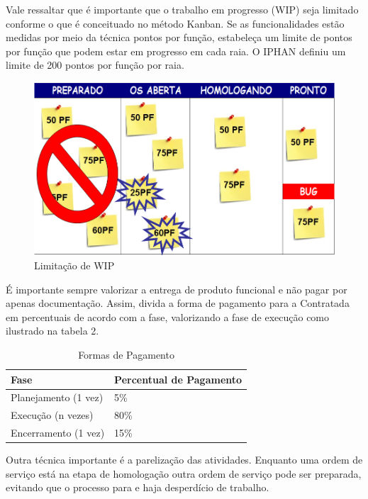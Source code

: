 Vale ressaltar que é importante que o trabalho em progresso (WIP) seja limitado conforme o que é conceituado no método Kanban. Se as funcionalidades estão medidas por meio da técnica pontos por função, estabeleça um limite de pontos por função que podem estar em progresso em cada raia. O IPHAN definiu um limite de 200 pontos por função por raia. 

\begin{figure}[h]
		\centering
		\label{fig08}
			\includegraphics[scale=0.5]{figuras/kanbanIPHAN4.png}
		\caption{Limitação de WIP \cite{parente}}
\end{figure}


É importante sempre valorizar a entrega de produto funcional e não pagar por apenas documentação. Assim, divida a forma de pagamento para a Contratada em percentuais de acordo com a fase, valorizando a fase de execução como ilustrado na tabela 2.


\begin{table}[htb]
\center
\footnotesize
\begin{tabular}{|p{6cm}|p{6cm}|}
  \hline
   \textbf{Fase} & \textbf{Percentual de Pagamento}\\
    \hline
   Planejamento (1 vez) & 5\%\\
   \hline    
   Execução (n vezes) & 80\%\\
    \hline
   Encerramento (1 vez) & 15\%\\
   \hline
\end{tabular}
\caption{Formas de Pagamento}
\end{table}


Outra técnica importante é a parelização das atividades. Enquanto uma ordem de serviço está na etapa de homologação outra ordem de serviço pode ser preparada, evitando que o processo para e haja desperdício de trabalho. 

